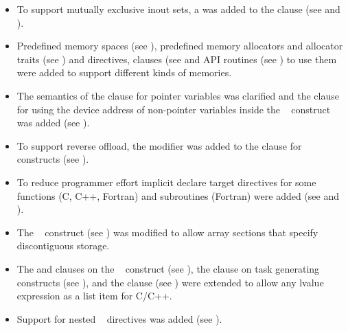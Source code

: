 \begin{itemize}
\item To support mutually exclusive inout sets, a 
       was added to the  clause (see
       and ).

\item Predefined memory spaces (see ), 
      predefined memory allocators and allocator traits (see 
      ) and directives, clauses (see 
       and API routines (see 
      ) to use them were added 
      to support different kinds of memories.

\item The semantics of the  clause for pointer variables
      was clarified and the  clause for using the 
      device address of non-pointer variables inside the 
      ~ construct was added 
      (see ).

\item To support reverse offload, the  modifier was
      added to the  clause for  constructs (see
      ).

\item To reduce programmer effort implicit declare target directives for
      some functions (C, C++, Fortran) and subroutines (Fortran) were added
      (see  and
      ).

\item The ~ construct (see ) was modified to allow array sections that specify 
      discontiguous storage.

\item The  and  clauses on the ~
    construct (see ), the
     clause on task generating constructs (see
    ), and the  clause (see
    ) were extended to allow any lvalue expression
    as a list item for C/C++.

\item Support for nested ~ directives was added
      (see ).


\end{itemize}
